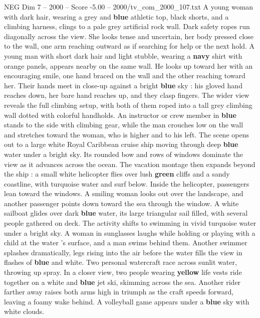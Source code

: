 \begin{textsample}{NEG Dim 7 – 2000 – Score -5.00 – 2000/tv\_com\_2000\_107.txt}  \label{ex:f7_neg_023}
A young woman with dark hair, wearing a grey and \textbf{blue} athletic top, black shorts, and a climbing harness, clings to a pale grey artificial rock wall.
Dark safety ropes run diagonally across the view.
She looks tense and uncertain, her body pressed close to the wall, one arm reaching outward as if searching for help or the next hold.
A young man with short dark hair and light stubble, wearing a \textbf{navy} shirt with orange panels, appears nearby on the same wall.
He looks up toward her with an encouraging smile, one hand braced on the wall and the other reaching toward her.
Their hands meet in close-up against a bright \textbf{blue} sky : his gloved hand reaches down, her bare hand reaches up, and they clasp fingers.
The wider view reveals the full climbing setup, with both of them roped into a tall grey climbing wall dotted with colorful handholds.
An instructor or crew member in \textbf{blue} stands to the side with climbing gear, while the man crouches low on the wall and stretches toward the woman, who is higher and to his left.
The scene opens out to a large white Royal Caribbean cruise ship moving through deep \textbf{blue} water under a bright sky.
Its rounded bow and rows of windows dominate the view as it advances across the ocean.
The vacation montage then expands beyond the ship : a small white helicopter flies over lush \textbf{green} cliffs and a sandy coastline, with turquoise water and surf below.
Inside the helicopter, passengers lean toward the windows.
A smiling woman looks out over the landscape, and another passenger points down toward the sea through the window.
A white sailboat glides over dark \textbf{blue} water, its large triangular sail filled, with several people gathered on deck.
The activity shifts to swimming in vivid turquoise water under a bright sky.
A woman in sunglasses laughs while holding or playing with a child at the water ’s surface, and a man swims behind them.
Another swimmer splashes dramatically, legs rising into the air before the water fills the view in flashes of \textbf{blue} and white.
Two personal watercraft race across sunlit water, throwing up spray.
In a closer view, two people wearing \textbf{yellow} life vests ride together on a white and \textbf{blue} jet ski, skimming across the sea.
Another rider farther away raises both arms high in triumph as the craft speeds forward, leaving a foamy wake behind.
A volleyball game appears under a \textbf{blue} sky with white clouds.

\end{textsample}
